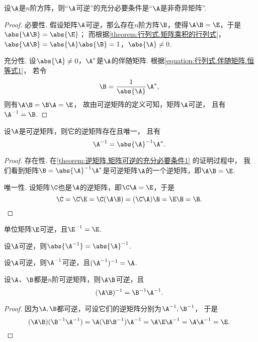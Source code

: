 \begin{theorem}\label{theorem:逆矩阵.矩阵可逆的充分必要条件1}
设\(\A\)是\(n\)阶方阵，则“\(\A\)可逆”的充分必要条件是“\(\A\)是非奇异矩阵”.
\begin{proof}
必要性.
假设矩阵\(\A\)可逆，那么存在\(n\)阶方阵\(\B\)，使得\(\A\B=\E\)，于是\(\abs{\A\B}=\abs{\E}\)；
而根据\cref{theorem:行列式.矩阵乘积的行列式}，
\(\abs{\A\B}=\abs{\A}\abs{\B}=1\)，\(\abs{\A}\neq0\).

充分性.
设\(\abs{\A}\neq0\)，\(\A^*\)是\(\A\)的伴随矩阵.
根据\cref{equation:行列式.伴随矩阵.恒等式1}，
若令\[
	\B=\frac{1}{\abs{\A}} \A^*,
\]
则有\(\A\B = \B\A = \E\)，
故由可逆矩阵的定义可知，矩阵\(\A\)可逆，
且有\(\A^{-1} = \B\).
\end{proof}
\end{theorem}

\begin{property}\label{theorem:逆矩阵.逆矩阵的唯一性}
设\(\A\)是可逆矩阵，则它的逆矩阵存在且唯一，
且有\begin{equation}
	\A^{-1} = \abs{\A}^{-1} \A^*.
\end{equation}
\begin{proof}
存在性.
在\cref{theorem:逆矩阵.矩阵可逆的充分必要条件1} 的证明过程中，
我们看到矩阵\(\B=\abs{\A}^{-1} \A^*\)是可逆矩阵\(\A\)的一个逆矩阵，即\(\A\B=\E\).

唯一性.
设矩阵\(\C\)也是\(\A\)的逆矩阵，即\(\C\A=\E\)，于是\[
	\C=\C\E=\C(\A\B)=(\C\A)\B=\E\B=\B.
	\qedhere
\]
\end{proof}
\end{property}

\begin{property}\label{theorem:逆矩阵.单位矩阵可逆}
单位矩阵\(\E\)可逆，且\(\E^{-1}=\E\).
\end{property}

\begin{property}\label{theorem:逆矩阵.逆矩阵的行列式}
设\(\A\)可逆，则\(\abs{\A^{-1}} = \abs{\A}^{-1}\).
\end{property}

\begin{property}\label{theorem:逆矩阵.逆矩阵的逆}
设\(\A\)可逆，则\(\A^{-1}\)可逆，且\((\A^{-1})^{-1} = \A\).
\end{property}

\begin{property}\label{theorem:逆矩阵.矩阵乘积的逆1}
设\(\A\)、\(\B\)都是\(n\)阶可逆矩阵，则\(\A\B\)可逆，且\begin{equation}
	(\A \B)^{-1} = \B^{-1} \A^{-1}.
\end{equation}
\begin{proof}
因为\(\A,\B\)都可逆，可设它们的逆矩阵分别为\(\A^{-1},\B^{-1}\)，
于是\[
	(\A\B)(\B^{-1}\A^{-1})
	= \A(\B\B^{-1})\A^{-1}
	= \A\E\A^{-1}
	= \A\A^{-1}
	= \E.
	\qedhere
\]
\end{proof}
\end{property}

